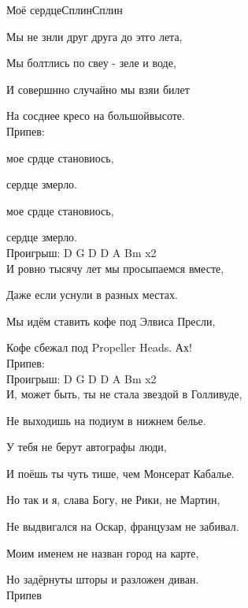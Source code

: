 \documentclass[11pt,a5paper]{book}
\renewcommand{\tt}{\indent \indent}
\begin{document}
\begin{song}{Моё сердце}{}{Сплин}{Сплин}{}{}

Мы не знли друг друга до этго лета,\par
Мы болтлись по свеу - зеле и воде,\par
И совершнно случайно мы взяи билет\par
На сосднее кресо на большойвысоте.\\

Припев:\par
{} мое срдце становиось,\par
{} сердце змерло.\par
{} мое срдце становиось,\par
{} сердце змерло.\\

Проигрыш: D G D D A Bm x2\\

И ровно тысячу лет мы просыпаемся вместе,\par
Даже если уснули в разных местах.\par
Мы идём ставить кофе под Элвиса Пресли,\par
Кофе сбежал под Propeller Heads. Ах!\\

Припев:\\

Проигрыш: D G D D A Bm x2\\

И, может быть, ты не стала звездой в Голливуде,\par
Не выходишь на подиум в нижнем белье.\par
У тебя не берут автографы люди,\par
И поёшь ты чуть тише, чем Монсерат Кабалье.\\

\newpage

Но так и я, слава Богу, не Рики, не Мартин,\par
Не выдвигался на Оскар, французам не забивал.\par
Моим именем не назван город на карте, \par
Но задёрнуты шторы и разложен диван.\\

Припев\\


\end{song}
\end{document}
